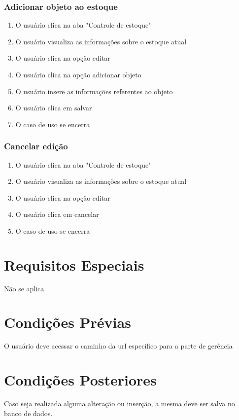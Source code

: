 \subsubsection{Adicionar objeto ao estoque}
\begin{enumerate}
	\item O usuário clica na aba "Controle de estoque"
	\item O usuário visualiza as informações sobre o estoque atual
	\item O usuário clica na opção editar
	\item O usuário clica na opção adicionar objeto
	\item O usuário insere as informações referentes ao objeto
	\item O usuário clica em salvar
	\item O caso de uso se encerra
\end{enumerate}

\subsubsection{Cancelar edição}
\begin{enumerate}
	\item O usuário clica na aba "Controle de estoque"
	\item O usuário visualiza as informações sobre o estoque atual
	\item O usuário clica na opção editar
	\item O usuário clica em cancelar
	\item O caso de uso se encerra
\end{enumerate}

\section{Requisitos Especiais}

Não se aplica

\section{Condições Prévias}

O usuário deve acessar o caminho da url específico para a parte de gerência

\section{Condições Posteriores}

Caso seja realizada alguma alteração ou inserção, a mesma deve ser salva no banco de dados.